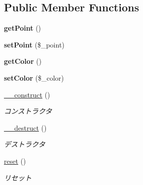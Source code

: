\subsection*{Public Member Functions}
\begin{DoxyCompactItemize}
\item 
\mbox{\label{class_reversi_history_a07a3d9858b0eee18a3aeed77197ce9f3}} 
{\bfseries get\+Point} ()
\item 
\mbox{\label{class_reversi_history_a90f70a3f275795c6cd5e7f5f8b65727d}} 
{\bfseries set\+Point} (\$\+\_\+point)
\item 
\mbox{\label{class_reversi_history_aa8642511e4effd1b9ff80c64ff788cfd}} 
{\bfseries get\+Color} ()
\item 
\mbox{\label{class_reversi_history_abfdefaf70a84d60cef2aa34422b74242}} 
{\bfseries set\+Color} (\$\+\_\+color)
\item 
\hyperlink{class_reversi_history_a095c5d389db211932136b53f25f39685}{\+\_\+\+\_\+construct} ()
\begin{DoxyCompactList}\small\item\em コンストラクタ \end{DoxyCompactList}\item 
\hyperlink{class_reversi_history_a421831a265621325e1fdd19aace0c758}{\+\_\+\+\_\+destruct} ()
\begin{DoxyCompactList}\small\item\em デストラクタ \end{DoxyCompactList}\item 
\hyperlink{class_reversi_history_a4a20559544fdf4dcb457e258dc976cf8}{reset} ()
\begin{DoxyCompactList}\small\item\em リセット \end{DoxyCompactList}\end{DoxyCompactItemize}

